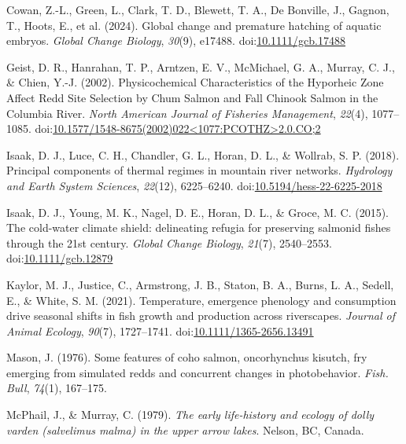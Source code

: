 \documentclass[10pt,a4paper,onecolumn]{article}
\newlength{\cslhangindent}
\newenvironment{CSLReferences}[2] %
 {\begin{list}{}{%
  \setlength{\itemindent}{0pt}
  \setlength{\leftmargin}{0pt}
  \setlength{\parsep}{0pt}
  \ifodd #1
   \setlength{\leftmargin}{\cslhangindent}
   \setlength{\itemindent}{-1\cslhangindent}
  \fi
  \setlength{\itemsep}{#2\baselineskip}}}
 {\end{list}}
\begin{document}
\begin{CSLReferences}{1}{0}
Cowan, Z.-L., Green, L., Clark, T. D., Blewett, T. A., De Bonville, J.,
Gagnon, T., Hoots, E., et al. (2024). Global change and premature
hatching of aquatic embryos. \emph{Global Change Biology}, \emph{30}(9),
e17488. doi:\href{https://doi.org/10.1111/gcb.17488}{10.1111/gcb.17488}

Geist, D. R., Hanrahan, T. P., Arntzen, E. V., McMichael, G. A., Murray,
C. J., \& Chien, Y.-J. (2002). Physicochemical Characteristics of the
Hyporheic Zone Affect Redd Site Selection by Chum Salmon and Fall
Chinook Salmon in the Columbia River. \emph{North American Journal of
Fisheries Management}, \emph{22}(4), 1077--1085.
doi:\href{https://doi.org/10.1577/1548-8675(2002)022\%3C1077:PCOTHZ\%3E2.0.CO;2}{10.1577/1548-8675(2002)022\textless1077:PCOTHZ\textgreater2.0.CO;2}

Isaak, D. J., Luce, C. H., Chandler, G. L., Horan, D. L., \& Wollrab, S.
P. (2018). Principal components of thermal regimes in mountain river
networks. \emph{Hydrology and Earth System Sciences}, \emph{22}(12),
6225--6240.
doi:\href{https://doi.org/10.5194/hess-22-6225-2018}{10.5194/hess-22-6225-2018}

Isaak, D. J., Young, M. K., Nagel, D. E., Horan, D. L., \& Groce, M. C.
(2015). The cold-water climate shield: delineating refugia for
preserving salmonid fishes through the 21st century. \emph{Global Change
Biology}, \emph{21}(7), 2540--2553.
doi:\href{https://doi.org/10.1111/gcb.12879}{10.1111/gcb.12879}

Kaylor, M. J., Justice, C., Armstrong, J. B., Staton, B. A., Burns, L.
A., Sedell, E., \& White, S. M. (2021). Temperature, emergence phenology
and consumption drive seasonal shifts in fish growth and production
across riverscapes. \emph{Journal of Animal Ecology}, \emph{90}(7),
1727--1741.
doi:\href{https://doi.org/10.1111/1365-2656.13491}{10.1111/1365-2656.13491}

Mason, J. (1976). Some features of coho salmon, oncorhynchus kisutch,
fry emerging from simulated redds and concurrent changes in
photobehavior. \emph{Fish. Bull}, \emph{74}(1), 167--175.

McPhail, J., \& Murray, C. (1979). \emph{The early life-history and
ecology of dolly varden (salvelimus malma) in the upper arrow lakes}.
Nelson, BC, Canada.


\end{CSLReferences}
\end{document}
